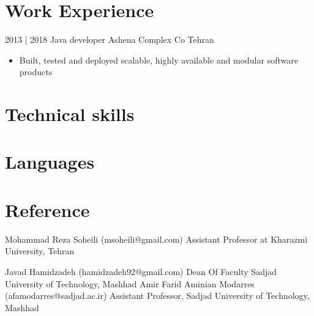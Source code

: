 \documentclass[letterpaper]{moderncv}        %
\begin{document}
\section{Work Experience}
\cventry
{2013 | 2018}
{Java developer}
{Ashena Complex Co}
{Tehran}
{}
{\begin{itemize}%
	\item Built, tested and deployed scalable, highly available and modular software products
	\end{itemize}}

\section{Technical skills}

\section{Languages}


\section{Reference}

\cventry
{}
{Mohammad Reza Soheili}
{(msoheili@gmail.com)}
{}
{}
{Assistant Professor at Kharazmi University, Tehran}


\cventry
{}
{Javad Hamidzadeh}
{(hamidzadeh92@gmail.com)}
{}
{}
{Dean Of Faculty Sadjad University of Technology, Mashhad}
\cventry
{}
{Amir Farid Aminian Modarres}
{(afamodarres@sadjad.ac.ir)}
{}
{}
{Assistant Professor, Sadjad University of Technology, Mashhad}
\end{document}
